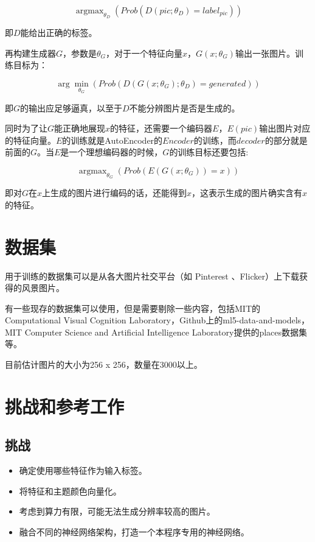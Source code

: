 \documentclass{article}
\begin{document}
$$\mathop{\arg\max}_{\theta_D}(Prob(D(pic; \theta_D)=label_{pic}))$$

即$D$能给出正确的标签。

再构建生成器$G$，参数是$\theta_G$，对于一个特征向量$x$，$G(x; \theta_G)$输出一张图片。训练目标为：

$$\arg\min_{\theta_G}(Prob(D(G(x; \theta_G); \theta_D)=generated))$$

即$G$的输出应足够逼真，以至于$D$不能分辨图片是否是生成的。

同时为了让$G$能正确地展现$x$的特征，还需要一个编码器$E$，$E(pic)$输出图片对应的特征向量。$E$的训练就是AutoEncoder的$Encoder$的训练，而$decoder$的部分就是前面的$G$。当$E$是一个理想编码器的时候，$G$的训练目标还要包括:

$$\mathop{\arg\max}_{\theta_G}(Prob(E(G(x; \theta_G))=x))$$

即对$G$在$x$上生成的图片进行编码的话，还能得到$x$，这表示生成的图片确实含有$x$的特征。


\section{数据集}

用于训练的数据集可以是从各大图片社交平台（如 Pinterest 、Flicker）上下载获得的风景图片。

有一些现存的数据集可以使用，但是需要剔除一些内容，包括MIT的Computational Visual Cognition Laboratory，Github上的ml5-data-and-models，MIT Computer Science and Artificial Intelligence Laboratory提供的places数据集等。

目前估计图片的大小为256 x 256，数量在3000以上。

\section{挑战和参考工作}

\subsection{挑战}
\begin{itemize}
	\item 确定使用哪些特征作为输入标签。
	\item 将特征和主题颜色向量化。
	\item 考虑到算力有限，可能无法生成分辨率较高的图片。
	\item 融合不同的神经网络架构，打造一个本程序专用的神经网络。
\end{itemize}
\end{document}
